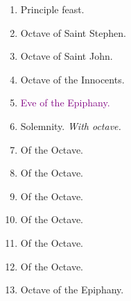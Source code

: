 		\begin{enumerate}
			\item {} Principle feast.
			\item Octave of Saint Stephen. 
			\item Octave of Saint John. 
			\item Octave of the Innocents. 
			\item \textcolor{purple}{Eve of the Epiphany.} 
			\item {} Solemnity. \textit{With octave.}
			\item Of the Octave. 
			\item Of the Octave. 
			\item Of the Octave. 
			\item Of the Octave. 
			\item Of the Octave. 
			\item Of the Octave. 
			\item Octave of the Epiphany. 
		\end{enumerate}